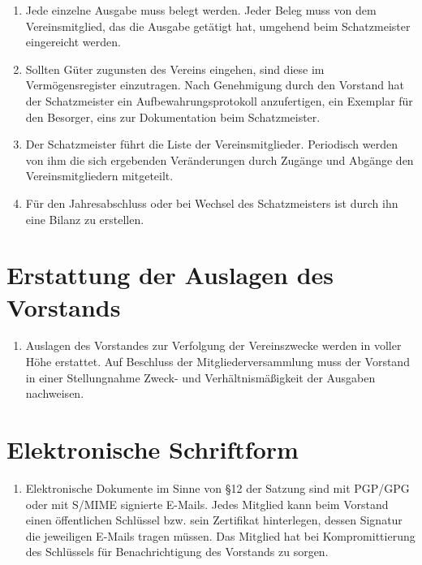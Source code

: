 \documentclass[fontsize=12pt,paper=a4,pagesize,headings=small]{scrartcl}
\begin{document}
\begin{enumerate}
    \item Jede einzelne Ausgabe muss belegt werden. Jeder Beleg muss von
        dem Vereinsmitglied, das die Ausgabe getätigt hat, umgehend beim
        Schatzmeister eingereicht werden.

    \item Sollten Güter zugunsten des Vereins eingehen, sind diese im
        Vermögensregister einzutragen. Nach Genehmigung durch den Vorstand hat
        der Schatzmeister ein Aufbewahrungsprotokoll anzufertigen, ein Exemplar
        für den Besorger, eins zur Dokumentation beim Schatzmeister.

    \item Der Schatzmeister führt die Liste der Vereinsmitglieder.
        Periodisch werden von ihm die sich ergebenden Veränderungen durch
        Zugänge und Abgänge den Vereinsmitgliedern mitgeteilt.

    \item Für den Jahresabschluss oder bei Wechsel des Schatzmeisters ist
        durch ihn eine Bilanz zu erstellen.

\end{enumerate}

\section{Erstattung der Auslagen des Vorstands}

\begin{enumerate}
    \item Auslagen des Vorstandes zur Verfolgung der Vereinszwecke werden
        in voller Höhe erstattet. Auf Beschluss der Mitgliederversammlung
        muss der Vorstand in einer Stellungnahme Zweck- und
        Verhältnismäßigkeit der Ausgaben nachweisen.
\end{enumerate}

\section{Elektronische Schriftform}

\begin{enumerate}
    \item Elektronische Dokumente im Sinne von §12 der Satzung sind mit
        PGP/GPG oder mit S/MIME signierte E-Mails. Jedes Mitglied kann beim
        Vorstand einen öffentlichen Schlüssel bzw. sein Zertifikat
        hinterlegen, dessen Signatur die jeweiligen E-Mails tragen müssen.
        Das Mitglied hat bei Kompromittierung des Schlüssels für
        Benachrichtigung des Vorstands zu sorgen.
\end{enumerate}
\end{document}
